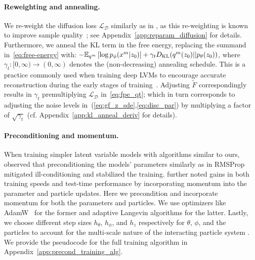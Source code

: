 \documentclass[twoside]{article}
\begin{document}
\paragraph{Reweighting and annealing.} We re-weight the diffusion loss $\mathcal{L}_{\mathcal{D}}$ similarly as in \citet{hodenoisingdiffusionprobabilistic2020}, as this re-weighting is known to improve sample quality~\citep{songMaximumLikelihoodTraining2021,kingmaunderstandingdiffusionobjectives2023}; see Appendix~\ref{app:reparam_diffusion} for details. Furthermore, we anneal the KL term in the free energy, replacing the summand in~\eqref{eq:free-energy} with: $-\mathbb{E}_{q^m}\left[\log {p_{\phi}( x^m|z_0)}\right] + \gamma_t D_{\mathrm{KL}}(q^m(z_0)||p_\theta(z_0))$, where $\gamma_t:[0,\infty)\to(0,\infty)$ denotes the (non-decreasing) annealing schedule. This is a practice commonly used when training deep \glspl*{LVM} to encourage accurate reconstruction during the early stages of training~\citep{sonderby2016ladderVAE,fu2019cyclicalannealingschedulesimple,vahdatNVAEDeepHierarchical2020,vahdatscorebasedgenerativemodeling2021}. Adjusting $\tilde{F}$ correspondingly results in $\gamma_t$ premultiplying $\mathcal{L}_{\mathcal{D}}$ in~\eqref{eq:fpe_qt}; which in turn corresponds to adjusting the noise levels in~(\ref{eq:gf_z_sde},\ref{eq:disc_par}) by multiplying a factor of $\sqrt{\gamma_t}$ (cf. Appendix~\ref{app:kl_anneal_deriv} for details).

\paragraph{Preconditioning and momentum.} When training simpler latent variable models with algorithms similar to ours, \cite{kuntz23a,limMomentumParticleMaximum2024} observed that preconditioning the models' parameters similarly as in RMSProp~\citep{tieleman2012lecture} mitigated ill-conditioning and stabilized the training. \cite{limMomentumParticleMaximum2024} further noted gains in both training speeds and test-time performance by incorporating momentum into the parameter and particle updates. Here we precondition and incorporate momentum for both the parameters and particles. We use optimizers like AdamW~\citep{loshchilov2019decoupledweightdecayregularization} for the former and adaptive Langevin algorithms \citep{Li2016, kim2020stochasticgradientlangevindynamics} for the latter. 
Lastly, we choose different step sizes $h_\theta$, $h_\phi$, and $h_z$ respectively for $\theta$, $\phi$, and the particles to account for the multi-scale nature of the interacting particle system \citep{akyildiz2024multiscaleperspectivemaximummarginal, Pavliotis2008}. We provide the pseudocode for the full training algorithm in Appendix~\ref{app:precond_training_alg}.
\end{document}
